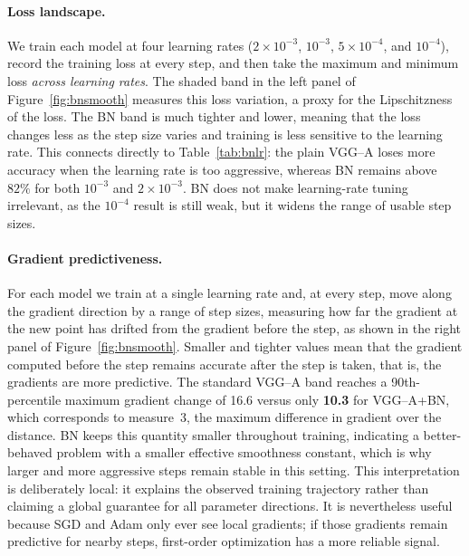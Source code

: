 \documentclass[11pt]{article}
\newcommand{\bnGradStd}{16.6}
\newcommand{\bnGradBn}{10.3}
\begin{document}
\paragraph{Loss landscape.}
We train each model at four learning rates ($2\times10^{-3}$, $10^{-3}$,
$5\times10^{-4}$, and $10^{-4}$), record the training loss at every step, and
then take the maximum and minimum loss \emph{across learning rates}. The shaded
band in the left panel of Figure~\ref{fig:bnsmooth} measures this loss
variation, a proxy for the Lipschitzness of the loss. The BN band is much
tighter and lower, meaning that the loss changes less as the step size varies
and training is less sensitive to the learning rate.
This connects directly to Table~\ref{tab:bnlr}: the plain VGG--A loses more
accuracy when the learning rate is too aggressive, whereas BN remains above
$82\%$ for both $10^{-3}$ and $2\times10^{-3}$. BN does not make learning-rate
tuning irrelevant, as the $10^{-4}$ result is still weak, but it widens the
range of usable step sizes.

\paragraph{Gradient predictiveness.}
For each model we train at a single learning rate and, at every step, move along
the gradient direction by a range of step sizes, measuring how far the gradient
at the new point has drifted from the gradient before the step, as shown in
the right panel of Figure~\ref{fig:bnsmooth}. Smaller and tighter values mean
that the gradient computed before the step remains accurate after the step is
taken, that is, the gradients are more predictive. The standard VGG--A band
reaches a 90th-percentile maximum gradient change of \bnGradStd{} versus only
\textbf{\bnGradBn} for VGG--A+BN,
which corresponds to measure~3, the maximum difference in gradient over the
distance. BN keeps this quantity smaller throughout training, indicating a
better-behaved problem with a smaller effective smoothness constant, which is
why larger and more aggressive steps remain stable in this setting.
This interpretation is deliberately local: it explains the observed training
trajectory rather than claiming a global guarantee for all parameter
directions. It is nevertheless useful because SGD and Adam only ever see local
gradients; if those gradients remain predictive for nearby steps, first-order
optimization has a more reliable signal.
\end{document}
